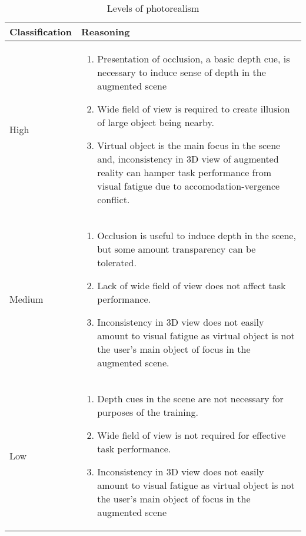 \begin{table}[h]
\centering
\caption{Levels of photorealism}
\label{tab:trainingoptions}
\begin{tabular}{@{}p{2cm}p{10cm}@{}}
\toprule
\multicolumn{1}{c}{\textbf{Classification}} & \multicolumn{1}{p{10cm}}{\textbf{Reasoning}} \\ 
\hline
High & \vspace{-2mm} \begin{enumerate}[leftmargin=*,topsep=0pt,partopsep=0pt,align=left,itemsep=0.05cm]
\item Presentation of occlusion, a basic depth cue, is necessary to induce sense of depth in the augmented scene
\item Wide field of view is required to create illusion of large object being nearby.	
\item  Virtual object is the main focus in the scene and, inconsistency in 3D view of augmented reality can hamper task performance from visual fatigue due to accomodation-vergence conflict.
\end{enumerate}
\vspace{-\baselineskip}\\
\hline
Medium & \vspace{-2mm} \begin{enumerate}[leftmargin=*,topsep=0pt,partopsep=0pt,align=left,itemsep=0.05cm]
\item Occlusion is useful to induce depth in the scene, but some amount transparency can be tolerated.
\item  Lack of wide field of view does not affect task performance. 
\item  Inconsistency in 3D view does not easily amount to visual fatigue as virtual object is not the user's main object of focus in the augmented scene.
\end{enumerate}
\vspace{-\baselineskip}\\
\hline
Low & \vspace{-2mm} \begin{enumerate}[leftmargin=*,topsep=0pt,partopsep=0pt,align=left,itemsep=0.05cm]
\item Depth cues in the scene are not necessary for purposes of the training.
\item Wide field of view is not required for effective task performance.
\item Inconsistency in 3D view does not easily amount to visual fatigue as virtual object is not the user's main object of focus in the augmented scene
\end{enumerate}
\vspace{-\baselineskip}\\
\bottomrule
\end{tabular}
\end{table}

